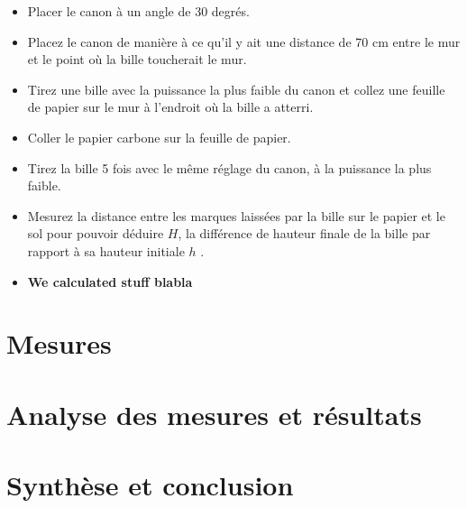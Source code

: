 \documentclass[12pt,a4paper]{article}
\begin{document}
    \begin{itemize}
        \item Placer le canon à un angle de 30 degrés.
        \item Placez le canon de manière à ce qu'il y ait une distance de 70 cm entre le mur et le point où la bille toucherait le mur.
        \item Tirez une bille avec la puissance la plus faible du canon et collez une feuille de papier sur le mur à l'endroit où la bille a atterri.
        \item Coller le papier carbone sur la feuille de papier.
        \item Tirez la bille 5 fois avec le même réglage du canon, à la puissance la plus faible.
        \item Mesurez la distance entre les marques laissées par la bille sur le papier et le sol pour pouvoir déduire $H$, la différence de hauteur finale de la bille par rapport à sa hauteur initiale $h$ .
        \item \textbf{We calculated stuff blabla}
    \end{itemize}

    \section{Mesures}

    \section{Analyse des mesures et résultats}

    \section{Synthèse et conclusion}
\end{document}
